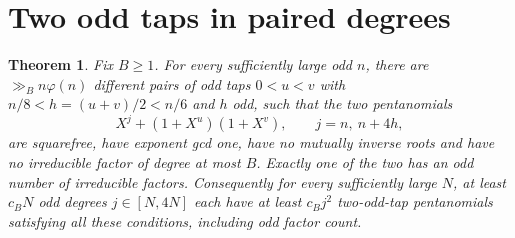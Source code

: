 \documentclass[11pt]{article}
\newtheorem{theorem}{Theorem}
\begin{document}
\section{Two odd taps in paired degrees}
\label{sec:paired-odd-degrees}
\begin{theorem}\label{thm:paired-odd-degrees}
Fix \(B\ge1\). For every sufficiently large odd \(n\), there are
\(\gg_B n\varphi(n)\) different pairs of odd taps \(0<u<v\) with
\(n/8<h=(u+v)/2<n/6\) and \(h\) odd, such that the two pentanomials
\[
  X^j+(1+X^u)(1+X^v),\qquad j=n,\ n+4h ,
\]
are squarefree, have exponent gcd one, have no mutually inverse
roots and have no irreducible factor of degree at most \(B\).
Exactly one of the two has an odd number of irreducible factors.
Consequently for every sufficiently large \(N\), at least \(c_B N\)
odd degrees \(j\in[N,4N]\) each have at least \(c_B j^2\) two-odd-tap
pentanomials satisfying all these conditions, including odd factor count.
\end{theorem}
\end{document}
